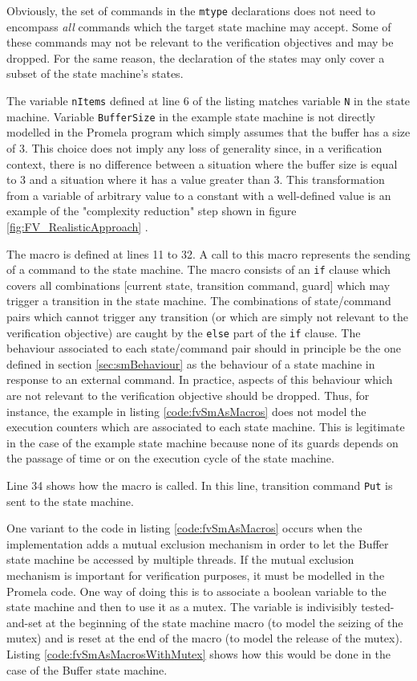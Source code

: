 \documentclass[a4paper,10pt]{article}
\begin{document}
Obviously, the set of commands in the \texttt{mtype} declarations does not need to encompass \textit{all} commands which the target state machine may accept. Some of these commands may not be relevant to the verification objectives and may be dropped. For the same reason, the declaration of the states may only cover a subset of the state machine's states.

The variable \texttt{nItems} defined at line 6 of the listing matches variable \texttt{N} in the state machine. Variable \texttt{BufferSize} in the example state machine is not directly modelled in the Promela program which simply assumes that the buffer has a size of 3. This choice does not imply any loss of generality since, in a verification context, there is no difference between a situation where the buffer size is equal to 3 and a situation where it has a value greater than 3. This transformation from a variable of arbitrary value to a constant with a well-defined value is an example of the "complexity reduction" step shown in figure \ref{fig:FV_RealisticApproach} .

The macro is defined at lines 11 to 32. A call to this macro represents the sending of a command to the state machine. The macro consists of an \texttt{if} clause which covers all combinations [current state, transition command, guard] which may trigger a transition in the state machine. The combinations of state/command pairs which cannot trigger any transition (or which are simply not relevant to the verification objective) are caught by the \texttt{else} part of the \texttt{if} clause. The behaviour associated to each state/command pair should in principle be the one defined in section \ref{sec:smBehaviour} as the behaviour of a state machine in response to an external command. In practice, aspects of this behaviour which are not relevant to the verification objective should be dropped. Thus, for instance, the example in listing \ref{code:fvSmAsMacros} does not model the execution counters which are associated to each state machine. This is legitimate in the case of the example state machine because none of its guards depends on the passage of time or on the execution cycle of the state machine.

Line 34 shows how the macro is called. In this line, transition command \texttt{Put} is sent to the state machine.

One variant to the code in listing \ref{code:fvSmAsMacros} occurs when the implementation adds a mutual exclusion mechanism in order to let the Buffer state machine be accessed by multiple threads. If the mutual exclusion mechanism is important for verification purposes, it must be modelled in the Promela code. One way of doing this is to associate a boolean variable to the state machine and then to use it as a mutex. The variable is indivisibly tested-and-set at the beginning of the state machine macro (to model the seizing of the mutex) and is reset at the end of the macro (to model the release of the mutex). Listing \ref{code:fvSmAsMacrosWithMutex} shows how this would be done in the case of the Buffer state machine.
\end{document}
